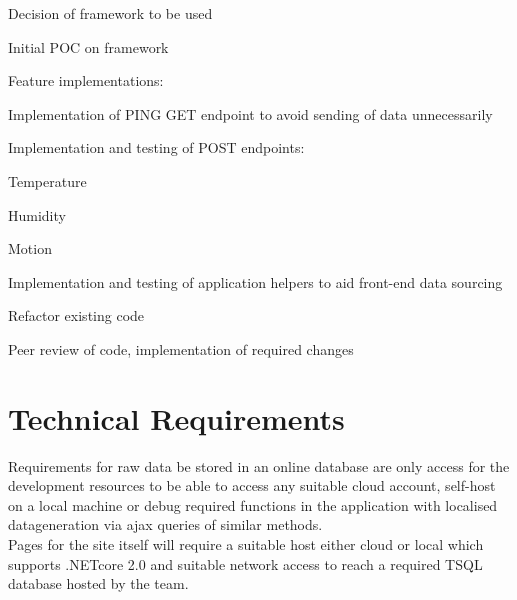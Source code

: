 \documentclass{article}
\begin{document}
\begin{legal}
\begin{legal}
                    \item Decision of framework to be used
                    \item Initial POC on framework
                    \item Feature implementations: 
                    \begin{legal}
                        \item Implementation of PING GET endpoint to avoid sending of data unnecessarily
                        \item Implementation and testing of POST endpoints:
                        \begin{legal}
                            \item Temperature
                            \item Humidity
                            \item Motion
                        \end{legal}
                        \item Implementation and testing of application helpers to aid front-end data sourcing
                    \end{legal}
                    \item Refactor existing code
                    \begin{legal}
                        \item Peer review of code, implementation of required changes
                    \end{legal}
                \end{legal}
            \end{legal}
        \newpage
    
    \section{Technical Requirements}
        Requirements for raw data be stored in an online database are only access
        for the development resources to be able to access any suitable cloud account, 
        self-host on a local machine or debug required functions in the application with 
        localised datageneration via ajax queries of similar methods.
        \\
        Pages for the site itself will require a suitable host either cloud or local which
        supports .NETcore 2.0\cite{DotNetCore2} and suitable network access to reach a
        required TSQL\cite{TSQL} database hosted by the team.
        \vspace{5mm}
\end{document}
